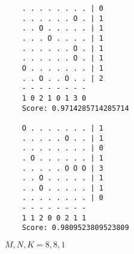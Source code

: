 \begin{figure}[h!]
    \begin{verbatim}
    . . . . . . . . | 0
    . . . . . . O . | 1
    . . O . . . . . | 1
    . . . O . . . . | 1
    . . . . . . O . | 1
    . . . . . . O . | 1
    O . . . . . . . | 1
    . . O . . O . . | 2
    - - - - - - - -
    1 0 2 1 0 1 3 0
    Score: 0.9714285714285714

    O . . . . . . . | 1
    . . . . . O . . | 1
    . . . . . . . . | 0
    . O . . . . . . | 1
    . . . . . O O O | 3
    . . O . . . . . | 1
    . . O . . . . . | 1
    . . . . . . . . | 0
    - - - - - - - -
    1 1 2 0 0 2 1 1
    Score: 0.9809523809523809
    \end{verbatim}
\caption{$M, N, K = 8, 8, 1$}
\end{figure}

